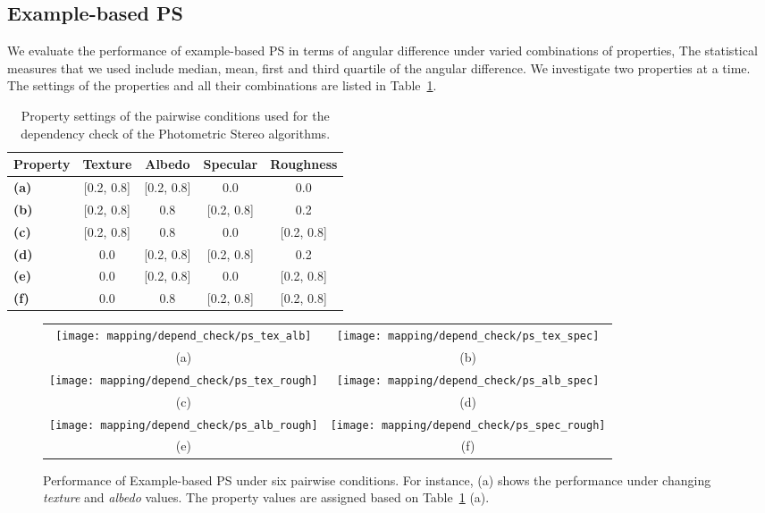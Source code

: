 \subsection{Example-based PS}
We evaluate the performance of example-based PS in terms of angular difference under varied combinations of properties, The statistical measures that we used include median, mean, first and third quartile of the angular difference. We investigate two properties at a time. The settings of the properties and all their combinations are listed in Table~\ref{tab:ps_depend_check_params}.

\begin{table}[!htbp]
  \centering
  \begin{tabular}{l*{4}{c}}
  \hline
  \textbf{Property} & Texture & Albedo & Specular & Roughness\\
  \hline
  \textbf{(a)} & [0.2, 0.8] & [0.2, 0.8] & 0.0 & 0.0\\
  \textbf{(b)} & [0.2, 0.8] & 0.8 & [0.2, 0.8] & 0.2\\
  \textbf{(c)} & [0.2, 0.8] & 0.8 & 0.0 & [0.2, 0.8]\\
  \textbf{(d)} & 0.0 & [0.2, 0.8] & [0.2, 0.8] & 0.2\\
  \textbf{(e)} & 0.0 & [0.2, 0.8] & 0.0 & [0.2, 0.8]\\
  \textbf{(f)} & 0.0 & 0.8 & [0.2, 0.8] & [0.2, 0.8]\\
  \hline
  \end{tabular}
  \caption{Property settings of the pairwise conditions used for the dependency check of the Photometric Stereo algorithms.}
  \label{tab:ps_depend_check_params}
\end{table}

\begin{figure}[!htbp]
\begin{tabular}{cc}
\texttt{[image: mapping/depend\_check/ps\_tex\_alb]}&
\texttt{[image: mapping/depend\_check/ps\_tex\_spec]}\\
(a) & (b)\\
\texttt{[image: mapping/depend\_check/ps\_tex\_rough]}&
\texttt{[image: mapping/depend\_check/ps\_alb\_spec]}\\
(c) & (d)\\
\texttt{[image: mapping/depend\_check/ps\_alb\_rough]}&
\texttt{[image: mapping/depend\_check/ps\_spec\_rough]}\\
(e) & (f)\\
\end{tabular}
\caption{Performance of Example-based PS under six pairwise conditions. For instance, (a) shows the performance under changing \textit{texture} and \textit{albedo} values. The property values are assigned based on Table~\ref{tab:ps_depend_check_params} (a).}
\label{fig:ps_depend_check}
\end{figure}


